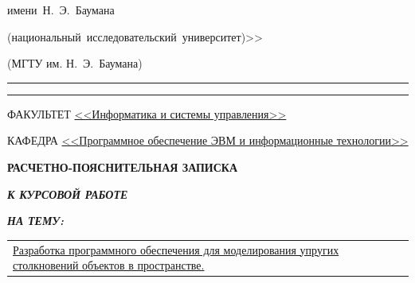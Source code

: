 \begin{titlepage}
\begin{center}
\begin{minipage}{0.85\textwidth}
{{                имени~Н.~Э.~Баумана

                (национальный~исследовательский~университет)>>
            }

                {(МГТУ им. Н.~Э.~Баумана)}
                \vspace{0.1cm}
            }
        \end{minipage}

        \vspace{0.2cm}
        \rule{\linewidth}{2.8pt}
        \rule[3ex]{\linewidth}{1pt}

        \begin{flushleft}
            {ФАКУЛЬТЕТ \uline{<<Информатика и системы управления>> \hfill}}

            \vspace{0.5cm}

            {КАФЕДРА \uline{<<Программное обеспечение ЭВМ и информационные технологии>> \hfill}}
        \end{flushleft}

        \vspace{2cm}

        {
            \Large{\textbf{РАСЧЕТНО-ПОЯСНИТЕЛЬНАЯ ЗАПИСКА}}

            \vspace{0.8cm}

            \large{\textbf{\textit{К КУРСОВОЙ РАБОТЕ}}}

            \vspace{0.75cm}

            \large{\textbf{\textit{НА ТЕМУ:}}}
        }

        \vspace{0.5cm}



        \begin{tabularx}{\linewidth}{@{}X@{}}
            \uline{
                \large Разработка \large программного \large обеспечения \large для \large моделирования \large упругих \large столкновений \large объектов \large в \large пространстве.
                \hfill}
        \end{tabularx}



\end{center}
\end{titlepage}
